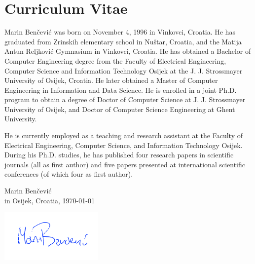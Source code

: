 \documentclass[
  11pt, %
  oneside, %
  english, %
  singlespacing, %
  liststotoc, %
  headsepline, %
  chapterinoneline, %
]{MastersDoctoralThesis} %
\begin{document}
\begin{refsection}

\printbibliography[heading=subbibintoc]
\end{refsection}

\begin{refsection}

\printbibliography[heading=subbibintoc]
\end{refsection}






\pagestyle{plain}
\chapter{Curriculum Vitae}

Marin Benčević was born on November 4, 1996 in Vinkovci, Croatia. He has graduated from Zrinskih elementary school in Nuštar, Croatia, and the Matija Antun Reljković Gymnasium in Vinkovci, Croatia. He has obtained a Bachelor of Computer Engineering degree from the Faculty of Electrical Engineering, Computer Science and Information Technology Osijek at the J. J. Strossmayer University of Osijek, Croatia. He later obtained a Master of Computer Engineering in Information and Data Science. He is enrolled in a joint Ph.D. program to obtain a degree of Doctor of Computer Science at J. J. Strossmayer University of Osijek, and Doctor of Computer Science Engineering at Ghent University.

He is currently employed as a teaching and research assistant at the Faculty of Electrical Engineering, Computer Science, and Information Technology Osijek. During his Ph.D. studies, he has published four research papers in scientific journals (all as first author) and five papers presented at international scientific conferences (of which four as first author).

\vspace{3cm}

\begin{flushright}
Marin Benčević\\
in Osijek, Croatia, \today

\includegraphics[width=5cm]{images/signature.png}
\end{flushright}
\end{document}
